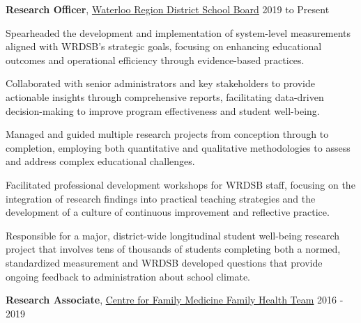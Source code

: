 \documentclass[10pt]{article}
\newenvironment{innerlist}[1][\enskip\textbullet]%
        {\begin{compactenum}[#1]}{\end{compactenum}}
\providecommand{\tightlist}{%
  \setlength{\itemsep}{0pt}\setlength{\parskip}{0pt}}
\begin{document}
\begin{outerlist}
\tightlist
\item
  \textbf{Research Officer},
  \href{https://www.wrdsb.ca/about-the-wrdsb/research/}{Waterloo Region
  District School Board} \hfill  2019 to Present

 \begin{innerlist}
  \tightlist
  \item
    Spearheaded the development and implementation of system-level
    measurements aligned with WRDSB's strategic goals, focusing on
    enhancing educational outcomes and operational efficiency through
    evidence-based practices.
  \item
    Collaborated with senior administrators and key stakeholders to
    provide actionable insights through comprehensive reports,
    facilitating data-driven decision-making to improve program
    effectiveness and student well-being.
  \item
    Managed and guided multiple research projects from conception
    through to completion, employing both quantitative and qualitative
    methodologies to assess and address complex educational challenges.
  \item
    Facilitated professional development workshops for WRDSB staff,
    focusing on the integration of research findings into practical
    teaching strategies and the development of a culture of continuous
    improvement and reflective practice.
  \item
    Responsible for a major, district-wide longitudinal student
    well-being research project that involves tens of thousands of
    students completing both a normed, standardized measurement and
    WRDSB developed questions that provide ongoing feedback to
    administration about school climate.
 \end{innerlist}
\item
  \textbf{Research Associate}, \href{https://family-medicine.ca/}{Centre
  for Family Medicine Family Health Team} \hfill 2016 - 2019


\end{outerlist}
\end{document}

